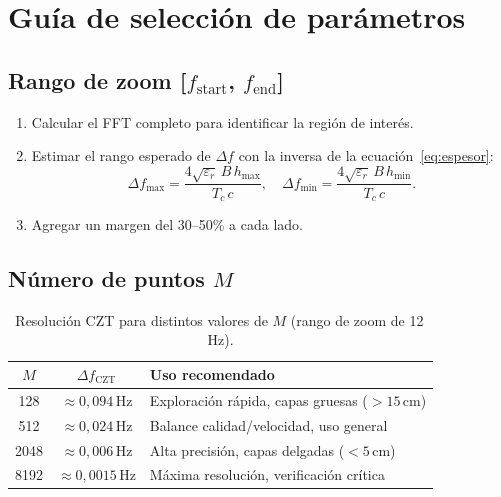 \documentclass[12pt, a4paper, twoside]{report}
\begin{document}
\section{Guía de selección de parámetros}
\label{sec:guia_params}

\subsection{Rango de zoom [$f_\text{start}$, $f_\text{end}$]}

\begin{enumerate}
  \item Calcular el FFT completo para identificar la región de interés.
  \item Estimar el rango esperado de $\Delta f$ con la inversa de la
    ecuación~\eqref{eq:espesor}:
    \begin{equation}
      \Delta f_\text{max} = \frac{4\sqrt{\varepsilon_r}\,B\,h_\text{max}}{T_c\,c},
      \quad
      \Delta f_\text{min} = \frac{4\sqrt{\varepsilon_r}\,B\,h_\text{min}}{T_c\,c}.
    \end{equation}
  \item Agregar un margen del 30–50\% a cada lado.
\end{enumerate}

\subsection{Número de puntos $M$}

\begin{table}[H]
  \centering
  \caption{Resolución CZT para distintos valores de $M$ (rango de
  zoom de 12\,Hz).}
  \label{tab:M_resolucion}
  \begin{tabular}{ccl}
    \toprule
    $M$ & $\Delta f_\text{CZT}$ & \textbf{Uso recomendado} \\
    \midrule
    128  & $\approx 0{,}094\,\text{Hz}$ & Exploración rápida, capas gruesas ($>15\,\text{cm}$) \\
    512  & $\approx 0{,}024\,\text{Hz}$ & Balance calidad/velocidad, uso general \\
    2048 & $\approx 0{,}006\,\text{Hz}$ & Alta precisión, capas delgadas ($<5\,\text{cm}$) \\
    8192 & $\approx 0{,}0015\,\text{Hz}$ & Máxima resolución, verificación crítica \\
    \bottomrule
  \end{tabular}
\end{table}
\end{document}
